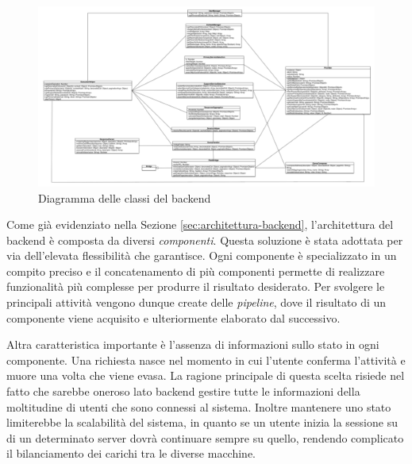 \begin{figure}[p]
	\centering
	\includegraphics[height=\textwidth, width=\textheight, angle=90]{5-implementazione-backend/Immagini/diagramma_classi_backend.png}
	\caption{Diagramma delle classi del backend}\label{fig:class-diagram-backend}
\end{figure}

Come già evidenziato nella Sezione \ref{sec:architettura-backend}, l'architettura del backend è composta da diversi \emph{componenti}. Questa soluzione è stata adottata per via dell'elevata flessibilità che garantisce. Ogni componente è specializzato in un compito preciso e il concatenamento di più componenti permette di realizzare funzionalità più complesse per produrre il risultato desiderato. Per svolgere le principali attività vengono dunque create delle \emph{pipeline}, dove il risultato di un componente viene acquisito e ulteriormente elaborato dal successivo.

Altra caratteristica importante è l'assenza di informazioni sullo stato in ogni componente. Una richiesta nasce nel momento in cui l'utente conferma l'attività e muore una volta che viene evasa. La ragione principale di questa scelta risiede nel fatto che sarebbe oneroso lato backend gestire tutte le informazioni della moltitudine di utenti che sono connessi al sistema. Inoltre mantenere uno stato limiterebbe la scalabilità del sistema, in quanto se un utente inizia la sessione su di un determinato server dovrà continuare sempre su quello, rendendo complicato il bilanciamento dei carichi tra le diverse macchine.

